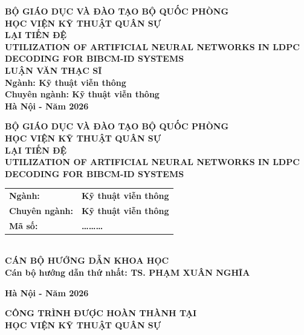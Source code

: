﻿\documentclass[a4paper,14pt]{extreport}
\newcommand{\thesisTitle}{UTILIZATION OF ARTIFICIAL NEURAL NETWORKS IN LDPC DECODING FOR BIBCM-ID SYSTEMS}
\newcommand{\studentName}{LẠI TIẾN ĐỆ}
\newcommand{\supervisorName}{TS. PHẠM XUÂN NGHĨA}
\newcommand{\majorName}{Kỹ thuật viễn thông}
\newcommand{\fieldName}{Kỹ thuật viễn thông}
\newcommand{\academyName}{HỌC VIỆN KỸ THUẬT QUÂN SỰ}
\begin{document}
\sloppy

\thispagestyle{empty}
\begin{center}
  \textbf{BỘ GIÁO DỤC VÀ ĐÀO TẠO \hfill BỘ QUỐC PHÒNG}\\[0.5cm]
  \textbf{\academyName}\\[2.4cm]

  {\bfseries\studentName}\\[2.0cm]

  {\bfseries\MakeUppercase{\thesisTitle}}\\[2.2cm]

  {\bfseries LUẬN VĂN THẠC SĨ}\\[0.5cm]
  \textbf{Ngành: \majorName}\\
  \textbf{Chuyên ngành: \fieldName}\\

  \vfill
  \textbf{Hà Nội - Năm 2026}
\end{center}

\newpage
\thispagestyle{empty}
\begin{center}
  \textbf{BỘ GIÁO DỤC VÀ ĐÀO TẠO \hfill BỘ QUỐC PHÒNG}\\[0.5cm]
  \textbf{\academyName}\\[2.2cm]

  {\bfseries\studentName}\\[1.8cm]

  {\bfseries\MakeUppercase{\thesisTitle}}\\[1.4cm]

  \begin{tabular}{ll}
    \textbf{Ngành:} & \textbf{\majorName}\\
    \textbf{Chuyên ngành:} & \textbf{\fieldName}\\
    \textbf{Mã số:} & \textbf{\ldots\ldots\ldots}
  \end{tabular}\\[1.6cm]

  \textbf{CÁN BỘ HƯỚNG DẪN KHOA HỌC}\\[0.4cm]
  \textbf{Cán bộ hướng dẫn thứ nhất: \supervisorName}

  \vfill
  \textbf{Hà Nội - Năm 2026}
\end{center}

\newpage
\thispagestyle{empty}
\begin{center}
  \textbf{CÔNG TRÌNH ĐƯỢC HOÀN THÀNH TẠI}\\[0.25cm]
  \textbf{\academyName}\\[1.2cm]
\end{center}
\end{document}
